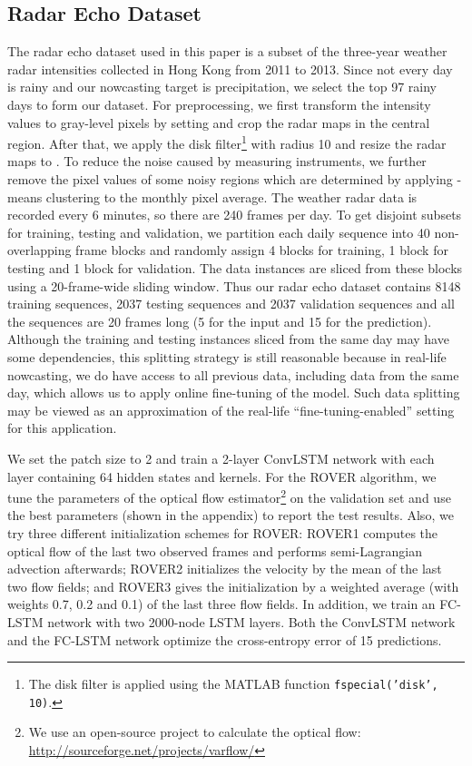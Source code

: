 \documentclass{article} \usepackage{amsmath}
\begin{document}
\subsection{Radar Echo Dataset}

The radar echo dataset used in this paper is a subset of the three-year weather radar intensities collected in Hong Kong from 2011 to 2013. Since not every day is rainy and our nowcasting target is precipitation, we select the top 97
rainy days to form our dataset. For preprocessing, we first transform the intensity values  to gray-level pixels  by setting  and crop the radar maps in the central  region. After that, we apply the disk filter\footnote{The disk filter is applied using the MATLAB function \texttt{fspecial('disk', 10)}.} with radius 10 and resize the radar maps to .
To reduce the noise caused by measuring instruments, we further remove the pixel values of some noisy regions which are determined by applying -means clustering to the monthly pixel average. The weather radar data is recorded every 6 minutes, so there are 240 frames per day. To get disjoint subsets for training, testing and validation, we partition each daily sequence into 40 non-overlapping frame blocks and randomly assign 4 blocks for training, 1 block for testing and 1 block for validation. The data instances are sliced from these blocks using a 20-frame-wide sliding window. Thus our radar echo dataset contains 8148 training sequences, 2037 testing sequences and 2037 validation sequences and all the sequences are 20 frames long (5 for the input and 15 for the prediction). Although the training and testing instances sliced from the same day may have some dependencies, this splitting strategy is still reasonable because in real-life nowcasting, we do have access to all previous data, including data from the same day, which allows us to apply online fine-tuning of the model.
Such data splitting may be viewed as an approximation of the real-life ``fine-tuning-enabled'' setting for this application.


We set the patch size to 2 and train a 2-layer ConvLSTM network with each layer containing 64 hidden states and  kernels. For the ROVER algorithm, we tune the parameters of the optical flow estimator\footnote{We use an open-source project to calculate the optical flow: \url{http://sourceforge.net/projects/varflow/}} on the validation set and use the best parameters (shown in the appendix) to report the test results. Also, we try three different initialization schemes for ROVER:
ROVER1 computes the optical flow of the last two observed frames and performs semi-Lagrangian advection afterwards; ROVER2 initializes the velocity by the mean of the last two flow fields; and ROVER3 gives the initialization by a weighted average (with weights 0.7, 0.2 and 0.1) of the last three flow fields. In addition, we train an FC-LSTM network with two 2000-node LSTM layers. Both the ConvLSTM network and the FC-LSTM network optimize the cross-entropy error of 15 predictions.
\end{document}

